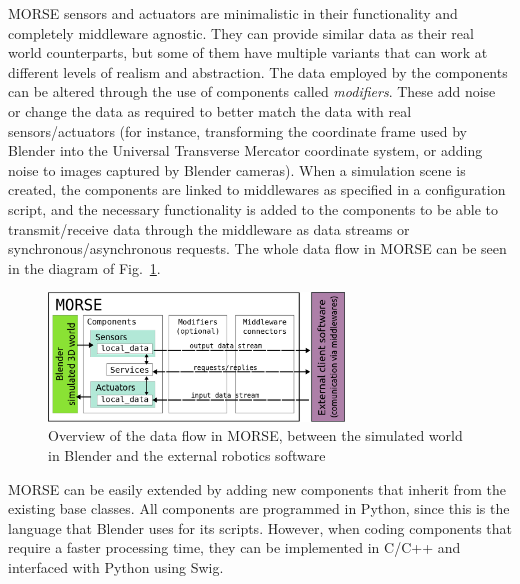 \documentclass{llncs}
\newcommand{\serge}[1]{\nb{Serge}{blue}{#1}}
\begin{document}
MORSE sensors and actuators are minimalistic in their functionality and completely
middleware agnostic. They can provide similar data as their real
world counterparts, but some of them have multiple variants that can work
at different levels of realism and abstraction.
The data employed by the components can be altered through the use of
components called \emph{modifiers}. These add noise or change the data as
required to better match the data with real sensors/actuators (for instance,
transforming the coordinate frame used by Blender into the Universal Transverse
Mercator coordinate system, or adding noise to images captured by Blender cameras).
When a simulation scene is created, the components are linked to middlewares as
specified in a configuration script, and the necessary functionality is added
to the components to be able to transmit/receive data through the middleware as
data streams or synchronous/asynchronous requests.
The whole data flow in MORSE can be seen in the diagram of
Fig.~\ref{fig:dataflow}.

\begin{figure}[ht!]
\centering
    \includegraphics[width=0.7\textwidth]{pics/simulation_main_loop-may2012.png}
\caption{Overview of the data flow in MORSE, between the simulated world
    in Blender and the external robotics software}
\label{fig:dataflow}
\end{figure}


MORSE can be easily extended by adding new components that inherit from the
existing base classes. All components are programmed in Python, since this is
the language that Blender uses for its scripts. However, when coding components
that require a faster processing time, they can be implemented in C/C++ and
interfaced with Python using Swig.
\end{document}

